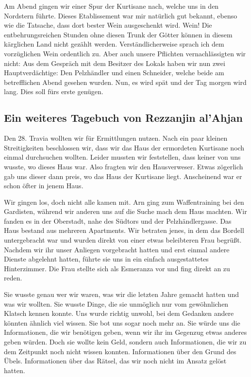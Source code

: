 Am Abend gingen wir einer Spur der Kurtisane nach, welche uns in den Nordstern führte. Dieses Etablissement war mir natürlich gut bekannt, ebenso wie die Tatsache, dass dort bester Wein ausgeschenkt wird. Wein! Die entbehrungsreichen Stunden ohne diesen Trunk der Götter können in diesem kärglichen Land nicht gezählt werden. Verständlicherweise sprach ich dem vorzüglichen Wein ordentlich zu. Aber auch unsere Pflichten vernachlässigten wir nicht: Aus dem Gespräch mit dem Besitzer des Lokals haben wir nun zwei Hauptverdächtige: Den Pelzhändler und einen Schneider, welche beide am betrefflichen Abend gesehen wurden. Nun, es wird spät und der Tag morgen wird lang. Dies soll fürs erste genügen. 


\subsection{Ein weiteres Tagebuch von Rezzanjin al'Ahjan}

Den 28. Travia wollten wir für Ermittlungen nutzen. Nach ein paar kleinen Streitigkeiten beschlossen wir, dass wir das Haus der ermordeten Kurtisane noch einmal durchsuchen wollten. Leider mussten wir feststellen, dass keiner von uns wusste, wo dieses Haus war. Also fragten wir den Hausverweser. Etwas zögerlich gab uns dieser dann preis, wo das Haus der Kurtisane liegt. Anscheinend war er schon öfter in jenem Haus. 


Wir gingen los, doch nicht alle kamen mit. Arn ging zum Waffentraining bei den Gardisten, während wir anderen uns auf die Suche mach dem Haus machten. Wir fanden es in der Oberstadt, nahe des Südtors und der Pelzhändlergasse. Das Haus bestand aus mehreren Apartments. Wir betraten jenes, in dem das Bordell untergebracht war und wurden direkt von einer etwas beleibteren Frau begrüßt. Nachdem wir ihr unser Anliegen vorgebracht hatten und erst einmal andere Dienste abgelehnt hatten, führte sie uns in ein einfach ausgestattetes Hinterzimmer. Die Frau stellte sich als Esmeranza vor und fing direkt an zu reden. 


Sie wusste genau wer wir waren, was wir die letzten Jahre gemacht hatten und was wir wollten. Sie wusste Dinge, die sie unmöglich nur vom gewöhnlichen Klatsch kennen konnte. Uns wurde richtig unwohl, bei dem Gedanken andere könnten ähnlich viel wissen. Sie bot uns sogar noch mehr an. Sie würde uns die Informationen, die wir benötigen geben, wenn wir ihr im Gegenzug etwas anderes geben würden. Doch sie wollte kein Geld, sondern auch Informationen, die wir zu dem Zeitpunkt noch nicht wissen konnten. Informationen über den Grund des Übels. Informationen über das Rätsel, das wir noch nicht im Ansatz gelöst hatten. 


